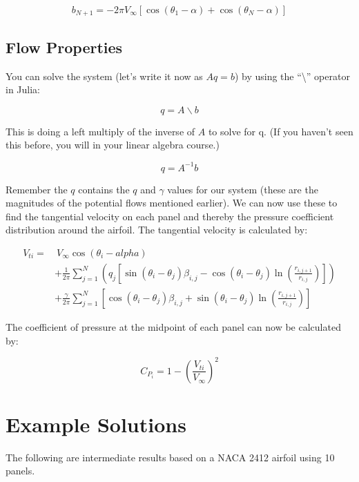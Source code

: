 \documentclass{article}%
\begin{document}
\begin{equation}
	b_{N+1} = -2\pi V_{\infty} \left[ \cos(\theta_1 - \alpha) + \cos(\theta_N - \alpha) \right]
\end{equation}

\subsection*{Flow Properties}

You can solve the system (let's write it now as $Aq=b$) by using the ``\textbackslash'' operator in Julia:

\begin{equation}
q = A \backslash b
\end{equation}

This is doing a left multiply of the inverse of $A$ to solve for q. (If you haven't seen this before, you will in your linear algebra course.)

\begin{equation}
	q = A^{-1} b
\end{equation}

Remember the $q$ contains the $q$ and $\gamma$ values for our system (these are the magnitudes of the potential flows mentioned earlier). We can now use these to find the tangential velocity on each panel and thereby the pressure coefficient distribution around the airfoil.  The tangential velocity is calculated by:

\begin{equation}
	\begin{aligned}
		V_{ti} =& ~V_\infty \cos(\theta_i-alpha) \\
		&+ \frac{1}{2\pi} \sum_{j=1}^N \left( q_j\left[ \sin(\theta_i-\theta_j)\beta_{i,j} - \cos(\theta_i-\theta_j) \ln\left(\frac{r_{i,j+1}}{r_{i,j}}\right) \right] \right)\\
		&+ \frac{\gamma}{2\pi} \sum_{j=1}^N \left[ \cos(\theta_i-\theta_j)\beta_{i,j} + \sin(\theta_i-\theta_j) \ln\left(\frac{r_{i,j+1}}{r_{i,j}}\right) \right]
	\end{aligned}
\end{equation}

The coefficient of pressure at the midpoint of each panel can now be calculated by:

\begin{equation}
	C_{P_i} = 1- \left(\frac{V_{ti}}{V_\infty}\right)^2
\end{equation}


\section*{Example Solutions}

The following are intermediate results based on a NACA 2412 airfoil using 10 panels.
\end{document}
